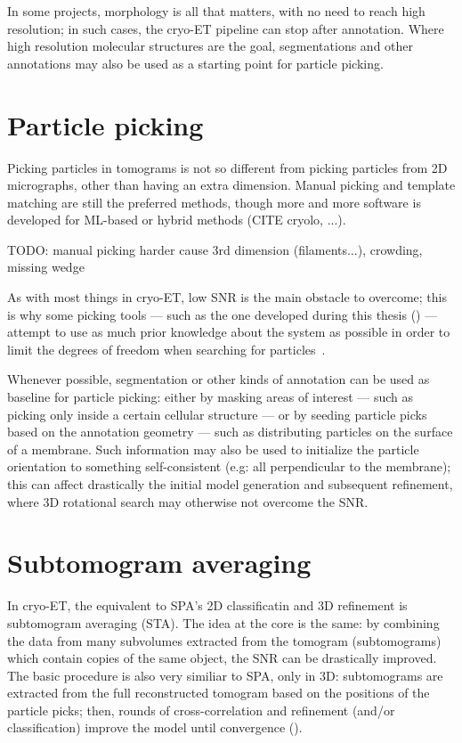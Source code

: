 In some projects, morphology is all that matters, with no need to reach high resolution; in such cases, the cryo-ET pipeline can stop after annotation.
Where high resolution molecular structures are the goal, segmentations and other annotations may also be used as a starting point for particle picking.

\section{Particle picking}\label{et_particle_picking}
Picking particles in tomograms is not so different from picking particles from 2D micrographs, other than having an extra dimension.
Manual picking and template matching are still the preferred methods, though more and more software is developed for ML-based or hybrid methods (CITE cryolo, ...).

TODO: manual picking harder cause 3rd dimension (filaments...), crowding, missing wedge

As with most things in cryo-ET, low SNR is the main obstacle to overcome; this is why some picking tools --- such as the one developed during this thesis () --- attempt to use as much prior knowledge about the system as possible in order to limit the degrees of freedom when searching for particles~\cite{castano-diezDynamoCatalogueGeometrical2017,wagnerEvolutionSPHIREcrYOLOParticle2020,gaifasBlikExtensible3D2024}.

Whenever possible, segmentation or other kinds of annotation can be used as baseline for particle picking: either by masking areas of interest --- such as picking only inside a certain cellular structure --- or by seeding particle picks based on the annotation geometry --- such as distributing particles on the surface of a membrane.
Such information may also be used to initialize the particle orientation to something self-consistent (e.g: all perpendicular to the membrane); this can affect drastically the initial model generation and subsequent refinement, where 3D rotational search may otherwise not overcome the SNR.

\section{Subtomogram averaging}\label{et_sta}
In cryo-ET, the equivalent to SPA's 2D classificatin and 3D refinement is subtomogram averaging (STA).
The idea at the core is the same: by combining the data from many subvolumes extracted from the tomogram (subtomograms) which contain copies of the same object, the SNR can be drastically improved.
The basic procedure is also very similiar to SPA, only in 3D: subtomograms are extracted from the full reconstructed tomogram based on the positions of the particle picks; then, rounds of cross-correlation and refinement (and/or classification) improve the model until convergence ().

